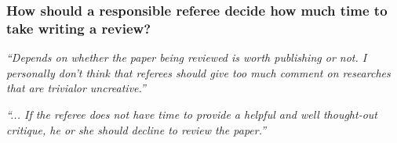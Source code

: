 \documentclass[12pt]{beamer}
\newcommand\ans[1]{{\it ``#1''}}
\newcommand\gap{\vspace{5mm}}
\begin{document}
\begin{frame}




\end{frame}

\begin{frame}   %

  \frametitle{ How should a responsible referee decide how much time to take writing a review? }

  \ans{Depends on whether the paper being reviewed is worth publishing or not.  I personally don’t think that referees should give too much comment on researches that are trivialor uncreative.}

  \ans{... If the referee does not have time to provide a helpful and well thought-out critique, he or she should decline to review the paper.}
  

\gap


\gap


\end{frame}
\end{document}
